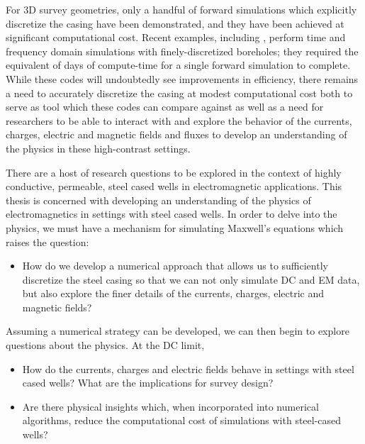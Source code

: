 For 3D survey geometries, only a handful of forward simulations which explicitly discretize the casing have been demonstrated, and they have been achieved at significant computational cost. Recent examples, including \cite{Commer2015, Um2015, Puzyrev2017}, perform time and frequency domain simulations with finely-discretized boreholes; they required the equivalent of days of compute-time for a single forward simulation to complete. While these codes will undoubtedly see improvements in efficiency, there remains a need to accurately discretize the casing at modest computational cost both to serve as tool which these codes can compare against as well as a need for researchers to be able to interact with and explore the behavior of the currents, charges, electric and magnetic fields and fluxes to develop an understanding of the physics in these high-contrast settings.

There are a host of research questions to be explored in the context of highly conductive, permeable, steel cased wells in electromagnetic applications. This thesis is concerned with developing an understanding of the physics of electromagnetics in settings with steel cased wells. In order to delve into the physics, we must have a mechanism for simulating Maxwell's equations which raises the question:
\begin{itemize}
\item{How do we develop a numerical approach that allows us to sufficiently discretize the steel casing so that we can not only simulate DC and EM data, but also explore the finer details of the currents, charges, electric and magnetic fields?}
\end{itemize}

Assuming a numerical strategy can be developed, we can then begin to explore questions about the physics. At the DC limit,
\begin{itemize}
\item{How do the currents, charges and electric fields behave in settings with steel cased wells? What are the implications for survey design?}
\item{Are there physical insights which, when incorporated into numerical algorithms, reduce the computational cost of simulations with steel-cased wells?}
\end{itemize}


